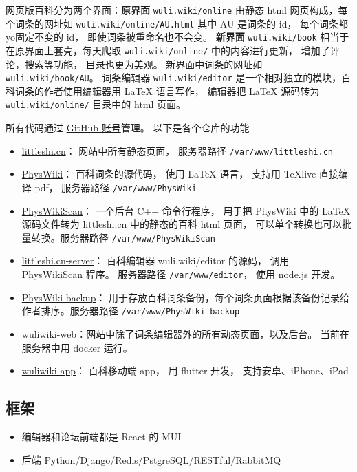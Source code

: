 
网页版百科分为两个界面：\textbf{原界面} \verb|wuli.wiki/online| 由静态 html 网页构成，每个词条的网址如 \verb|wuli.wiki/online/AU.html| 其中 AU 是词条的 id， 每个词条都yo固定不变的 id， 即使词条被重命名也不会变。  \textbf{新界面} \verb|wuli.wiki/book| 相当于在原界面上套壳，每天爬取 \verb|wuli.wiki/online/| 中的内容进行更新， 增加了评论，搜索等功能， 目录也更为美观。 新界面中词条的网址如 \verb|wuli.wiki/book/AU|。
词条编辑器 \verb|wuli.wiki/editor| 是一个相对独立的模块，百科词条的作者使用编辑器用 LaTeX 语言写作， 编辑器把 LaTeX 源码转为 \verb|wuli.wiki/online/| 目录中的 html 页面。

所有代码通过 \href{https://github.com/wuliwiki}{GitHub 账号}管理。 以下是各个仓库的功能
\begin{itemize}
\item \href{https://github.com/MacroUniverse/littleshi.cn}{littleshi.cn}： 网站中所有静态页面， 服务器路径 \verb|/var/www/littleshi.cn|
\item \href{https://github.com/MacroUniverse/PhysWiki}{PhysWiki}： 百科词条的源代码， 使用 LaTeX 语言， 支持用 TeXlive 直接编译 pdf， 服务器路径 \verb|/var/www/PhysWiki|
\item \href{https://github.com/MacroUniverse/PhysWikiScan}{PhysWikiScan}： 一个后台 C++ 命令行程序， 用于把 PhysWiki 中的 LaTeX 源码文件转为 littleshi.cn 中的静态的百科 html 页面， 可以单个转换也可以批量转换。服务器路径 \verb|/var/www/PhysWikiScan|
\item \href{https://github.com/MacroUniverse/littleshi.cn-server}{littleshi.cn-server}： 百科编辑器 wuli.wiki/editor 的源码， 调用 PhysWikiScan 程序。 服务器路径 \verb|/var/www/editor|， 使用 node.js 开发。
\item \href{https://github.com/MacroUniverse/PhysWiki-backup}{PhysWiki-backup}： 用于存放百科词条备份，每个词条页面根据该备份记录给作者排序。服务器路径 \verb|/var/www/PhysWiki-backup|
\item \href{https://github.com/MacroUniverse/wuliwiki-web}{wuliwiki-web}：网站中除了词条编辑器外的所有动态页面，以及后台。 当前在服务器中用 docker 运行。
\item \href{https://github.com/MacroUniverse/wuliwiki-app}{wuliwiki-app}： 百科移动端 app， 用 flutter 开发， 支持安卓、iPhone、iPad
\end{itemize}

\subsection{框架}
\begin{itemize}
\item 编辑器和论坛前端都是 React 的 MUI
\item 后端 Python/Django/Redis/PstgreSQL/RESTful/RabbitMQ
\end{itemize}
